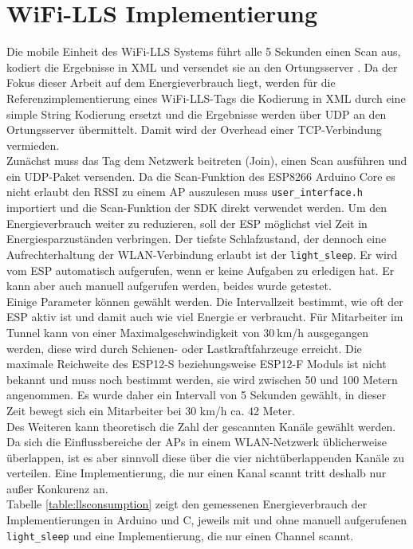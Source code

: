 \section{WiFi-LLS Implementierung}
\label{ch:phase1:sec:wifills}
Die mobile Einheit des WiFi-LLS Systems führt alle 5 Sekunden einen Scan aus, kodiert die Ergebnisse in XML und versendet sie an den Ortungsserver \cite{chen2007design}.
Da der Fokus dieser Arbeit auf dem Energieverbrauch liegt, werden für die Referenzimplementierung eines WiFi-LLS-Tags die Kodierung in XML durch eine simple String Kodierung ersetzt und die Ergebnisse werden über UDP an den Ortungsserver übermittelt. 
Damit wird der Overhead einer TCP-Verbindung vermieden.\\
Zunächst muss das Tag dem Netzwerk beitreten (Join), einen Scan ausführen und ein UDP-Paket versenden.
Da die Scan-Funktion des ESP8266 Arduino Core es nicht erlaubt den RSSI zu einem AP auszulesen muss \texttt{user\_interface.h} importiert und die Scan-Funktion der SDK direkt verwendet werden.
Um den Energieverbrauch weiter zu reduzieren, soll der ESP möglichst viel Zeit in Energiesparzuständen verbringen.
Der tiefste Schlafzustand, der dennoch eine Aufrechterhaltung der WLAN-Verbindung erlaubt ist der \texttt{light\_sleep}. 
Er wird vom ESP automatisch aufgerufen, wenn er keine Aufgaben zu erledigen hat.
Er kann aber auch manuell aufgerufen werden, beides wurde getestet.\\
Einige Parameter können gewählt werden. 
Die Intervallzeit bestimmt, wie oft der ESP aktiv ist und damit auch wie viel Energie er verbraucht.
Für Mitarbeiter im Tunnel kann von einer Maximalgeschwindigkeit von $30\ $km/h ausgegangen werden, diese wird durch Schienen- oder Lastkraftfahrzeuge erreicht. 
Die maximale Reichweite des ESP12-S beziehungsweise ESP12-F Moduls ist nicht bekannt und muss noch bestimmt werden, sie wird zwischen 50 und 100 Metern angenommen.
Es wurde daher ein Intervall von 5 Sekunden gewählt, in dieser Zeit bewegt sich ein Mitarbeiter bei 30 km/h ca. 42 Meter.\\
Des Weiteren kann theoretisch die Zahl der gescannten Kanäle gewählt werden. 
Da sich die Einflussbereiche der APs in einem WLAN-Netzwerk üblicherweise überlappen, ist es aber sinnvoll diese über die vier nichtüberlappenden Kanäle zu verteilen. 
Eine Implementierung, die nur einen Kanal scannt tritt deshalb nur außer Konkurenz an.\\
Tabelle \ref{table:llsconsumption} zeigt den gemessenen Energieverbrauch der Implementierungen in Arduino und C, jeweils mit und ohne manuell aufgerufenen \texttt{light\_sleep} und eine Implementierung, die nur einen Channel scannt.
